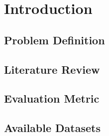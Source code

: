 \section{Introduction}
\label{sec:introduction}



\subsection{Problem Definition}

 
 

\subsection{Literature Review}
\label{sec:literature-review}

 
 
\subsection{Evaluation Metric}
\label{sec:evaluation-metric}


\subsection{Available Datasets}
\label{sec:available_datasets}
